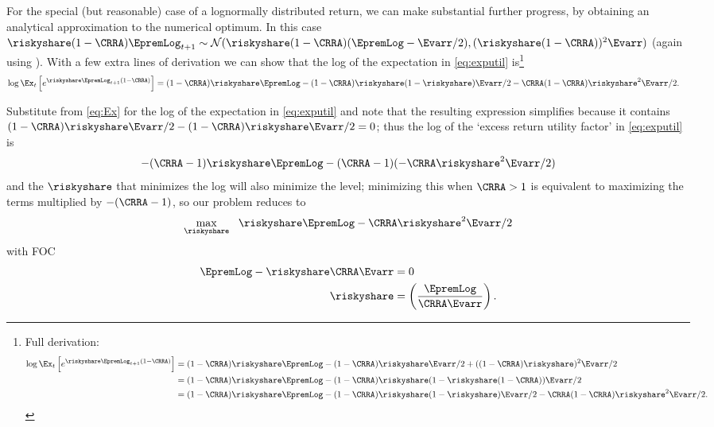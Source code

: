 \hypertarget{lognormal-returns}{}
For the special (but reasonable) case of a lognormally distributed return, we can make substantial further progress, by obtaining an analytical approximation to the numerical optimum.  In this case $\riskyshare (1-\CRRA) \EpremLog_{t+1} \sim \mathcal{N}(\riskyshare (1-\CRRA)(\EpremLog - \Evarr/2),(\riskyshare(1-\CRRA))^{2}\Evarr)$ (again using \LogELogNormTimes).  With a few extra lines of derivation we can show that the log of the expectation in \eqref{eq:exputil} is\footnote{Full derivation:
\begin{equation}\begin{split}
  \log \Ex_{t}\left[e^{\riskyshare \EpremLog_{t+1}  (1-\CRRA)}\right] & =  {(1-\CRRA)\riskyshare \EpremLog-(1-\CRRA)\riskyshare\Evarr/2+ ((1-\CRRA)\riskyshare)^{2}\Evarr/2} \notag
\\  & =  {(1-\CRRA)\riskyshare \EpremLog-(1-\CRRA)\riskyshare(1-\riskyshare(1-\CRRA))\Evarr/2}
\\  & =  {(1-\CRRA)\riskyshare \EpremLog-(1-\CRRA)\riskyshare(1-\riskyshare)\Evarr/2-\CRRA (1-\CRRA)\riskyshare^{2}\Evarr/2}.
\end{split}\end{equation}
}
\begin{equation}\label{eq:Ex}\begin{split}
  \log \Ex_{t}\left[e^{\riskyshare \EpremLog_{t+1}  (1-\CRRA)}\right] & =  {(1-\CRRA)\riskyshare \EpremLog-(1-\CRRA)\riskyshare(1-\riskyshare)\Evarr/2-\CRRA (1-\CRRA)\riskyshare^{2}\Evarr/2}.
\end{split}\end{equation}

Substitute from \eqref{eq:Ex} for the log of the expectation in
\eqref{eq:exputil} and note that the resulting expression simplifies because it contains
${(1-\CRRA)\riskyshare\Evarr/2-(1-\CRRA)\riskyshare\Evarr/2}=0$;
thus the log of the `excess return utility factor' in \eqref{eq:exputil} is
\begin{equation}
  -(\CRRA-1)\riskyshare \EpremLog - (\CRRA-1)(- \CRRA \riskyshare^{2}\Evarr/2)
\end{equation}
and the $\riskyshare$ that minimizes the log will also
minimize the level; minimizing this when $\CRRA>1$ is equivalent to
maximizing the terms multiplied by $-(\CRRA-1)$, so our problem
reduces to
\begin{equation*}\begin{gathered}\begin{aligned}
\max_{\riskyshare}~~ \riskyshare \EpremLog -\CRRA\riskyshare^{2}\Evarr/2
\end{aligned}\end{gathered}\end{equation*}
with FOC \hypertarget{riskyshareMS}{}
\begin{equation}\begin{gathered}\begin{aligned}
         \EpremLog-\riskyshare\CRRA\Evarr  & =  0  \label{eq:riskyshareMS} \\
\riskyshare & =  \left(\frac{\EpremLog}{\CRRA \Evarr}\right) .
\end{aligned}\end{gathered}\end{equation}


